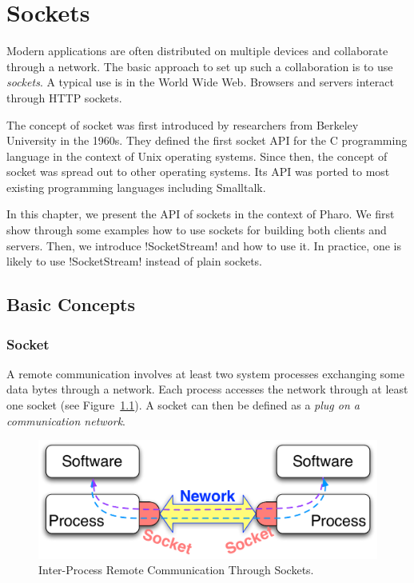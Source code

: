 \documentclass[a4paper,10pt,twoside]{book}
\begin{document}
	\sloppy
\fi
\newcommand{\nouryComment}[1]{}


\chapter{Sockets}\label{cha:sockets}
\chapterauthor{\authornoury{}}

Modern applications are often distributed on multiple devices and collaborate through a network.
The basic approach to set up such a collaboration is to use \textit{sockets}. A typical use is in the World Wide Web. Browsers and servers interact through HTTP sockets.

The concept of socket was first introduced by researchers from Berkeley University in the 1960s. They defined the first socket API for the C programming language in the context of Unix operating systems. Since then, the concept of socket was spread out to other operating systems. 
Its API was ported to most existing programming languages including Smalltalk.

In this chapter, we present the API of sockets in the context of Pharo.
We first show through some examples how to use sockets for building both clients and servers. 
Then, we introduce \ct!SocketStream! and how to use it.
In practice, one is likely to use \ct!SocketStream! instead of plain sockets.

\section{Basic Concepts}
\subsection{Socket}
A remote communication involves at least two system processes exchanging some data bytes through a network. Each process accesses the network through at least one socket (see Figure~\ref{fig:socketConcept}).
A socket can then be defined as a \textit{plug on a communication network}.

\begin{figure}[ht]\centering
	\includegraphics[width=.75\linewidth]{socketConcept}
	\caption{Inter-Process Remote Communication Through Sockets.}
	\label{fig:socketConcept}
\end{figure}
\end{document}
